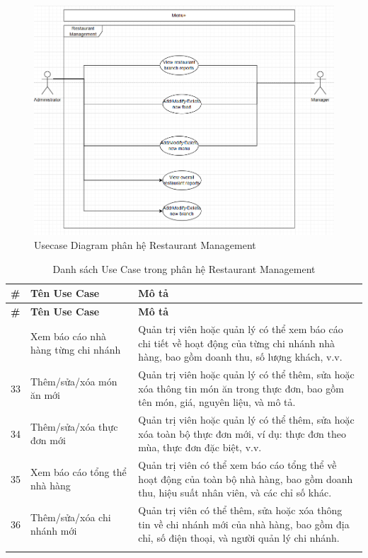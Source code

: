         \begin{figure}[H]
	\centering
	\includegraphics[width=\linewidth]{Images/ucd-rm.png}
	\caption{Usecase Diagram phân hệ Restaurant Management}
        \end{figure}
        
        \begin{longtable}{|p{1cm}|p{5cm}|p{9cm}|}
        \hline
        \textbf{\#} & \textbf{Tên Use Case} & \textbf{Mô tả} \\ 
        \hline
        \endfirsthead
        \hline
        \textbf{\#} & \textbf{Tên Use Case} & \textbf{Mô tả} \\ 
        \endhead
        \hline
        \endfoot
        \hline
        \endlastfoot
        32 & Xem báo cáo nhà hàng từng chi nhánh & Quản trị viên hoặc quản lý có thể xem báo cáo chi tiết về hoạt động của từng chi nhánh nhà hàng, bao gồm doanh thu, số lượng khách, v.v. \\ 
        \hline
        33 & Thêm/sửa/xóa món ăn mới & Quản trị viên hoặc quản lý có thể thêm, sửa hoặc xóa thông tin món ăn trong thực đơn, bao gồm tên món, giá, nguyên liệu, và mô tả. \\ 
        \hline
        34 & Thêm/sửa/xóa thực đơn mới & Quản trị viên hoặc quản lý có thể thêm, sửa hoặc xóa toàn bộ thực đơn mới, ví dụ: thực đơn theo mùa, thực đơn đặc biệt, v.v. \\ 
        \hline
        35 & Xem báo cáo tổng thể nhà hàng & Quản trị viên có thể xem báo cáo tổng thể về hoạt động của toàn bộ nhà hàng, bao gồm doanh thu, hiệu suất nhân viên, và các chỉ số khác. \\ 
        \hline
        36 & Thêm/sửa/xóa chi nhánh mới & Quản trị viên có thể thêm, sửa hoặc xóa thông tin về chi nhánh mới của nhà hàng, bao gồm địa chỉ, số điện thoại, và người quản lý chi nhánh. \\ 
        \hline
        \caption{Danh sách Use Case trong phân hệ Restaurant Management}\\
        \end{longtable}

